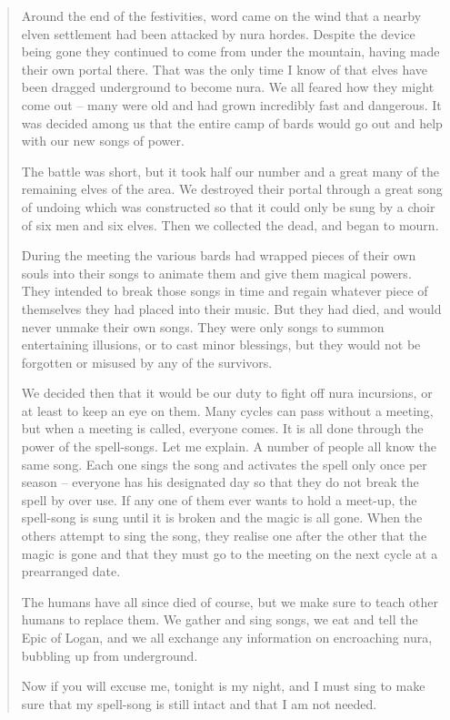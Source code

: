 \begin{multicols}{2}
\begin{quotation}
	Around the end of the festivities, word came on the wind that a nearby elven settlement had been attacked by nura hordes.
	Despite the device being gone they continued to come from under the mountain, having made their own portal there.
	That was the only time I know of that elves have been dragged underground to become nura.
	We all feared how they might come out -- many were old and had grown incredibly fast and dangerous.
	It was decided among us that the entire camp of bards would go out and help with our new songs of power.

	The battle was short, but it took half our number and a great many of the remaining elves of the area.
	We destroyed their portal through a great song of undoing which was constructed so that it could only be sung by a choir of six men and six elves.
	Then we collected the dead, and began to mourn.

	During the meeting the various bards had wrapped pieces of their own souls into their songs to animate them and give them magical powers.
	They intended to break those songs in time and regain whatever piece of themselves they had placed into their music.
	But they had died, and would never unmake their own songs.
	They were only songs to summon entertaining illusions, or to cast minor blessings, but they would not be forgotten or misused by any of the survivors.

	We decided then that it would be our duty to fight off nura incursions, or at least to keep an eye on them.
	Many cycles can pass without a meeting, but when a meeting is called, everyone comes.
	It is all done through the power of the spell-songs.
	Let me explain.
	A number of people all know the same song.
	Each one sings the song and activates the spell only once per season -- everyone has his designated day so that they do not break the spell by over use.
	If any one of them ever wants to hold a meet-up, the spell-song is sung until it is broken and the magic is all gone.
	When the others attempt to sing the song, they realise one after the other that the magic is gone and that they must go to the meeting on the next cycle at a prearranged date.

	The humans have all since died of course, but we make sure to teach other humans to replace them.
	We gather and sing songs, we eat and tell the Epic of Logan, and we all exchange any information on encroaching nura, bubbling up from underground.

	Now if you will excuse me, tonight is my night, and I must sing to make sure that my spell-song is still intact and that I am not needed.


\end{quotation}
\end{multicols}
